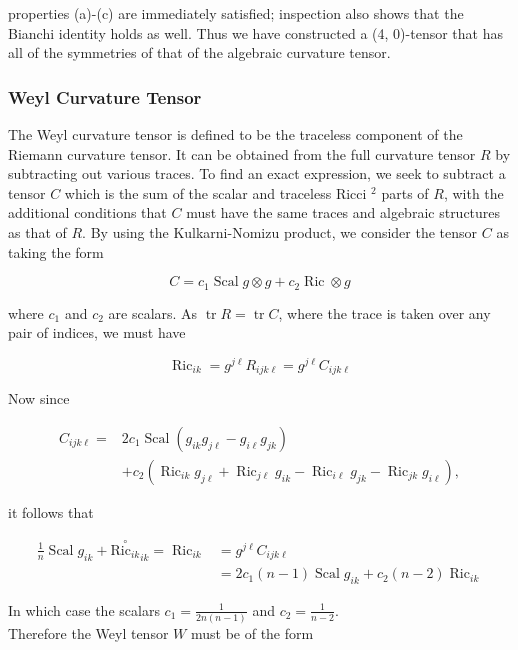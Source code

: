 \documentclass[10pt, letterpaper]{article}
\begin{document}
properties (a)-(c) are immediately satisfied; inspection also shows that the Bianchi identity holds as well. Thus we have constructed a (4, 0)-tensor that has all of the symmetries of that of the algebraic curvature tensor.

\subsubsection*{Weyl Curvature Tensor}
The Weyl curvature tensor is defined to be the traceless component of the Riemann curvature tensor. It can be obtained from the full curvature tensor $R$ by subtracting out various traces. To find an exact expression, we seek to subtract a tensor $C$ which is the sum of the scalar and traceless Ricci ${ }^{2}$ parts of $R$, with the additional conditions that $C$ must have the same traces and algebraic structures as that of $R$. By using the Kulkarni-Nomizu product, we consider the tensor $C$ as taking the form

$$
C=c_{1} \operatorname{Scal} g \otimes g+c_{2} \operatorname{Ric} \otimes g
$$

where $c_{1}$ and $c_{2}$ are scalars. As $\operatorname{tr} R=\operatorname{tr} C$, where the trace is taken over any pair of indices, we must have

$$
\operatorname{Ric}_{i k}=g^{j \ell} R_{i j k \ell}=g^{j \ell} C_{i j k \ell}
$$

Now since

$$
\begin{aligned}
C_{i j k \ell}= & 2 c_{1} \operatorname{Scal}\left(g_{i k} g_{j \ell}-g_{i \ell} g_{j k}\right) \\
& +c_{2}\left(\operatorname{Ric}_{i k} g_{j \ell}+\operatorname{Ric}_{j \ell} g_{i k}-\operatorname{Ric}_{i \ell} g_{j k}-\operatorname{Ric}_{j k} g_{i \ell}\right),
\end{aligned}
$$

it follows that

$$
\begin{aligned}
\frac{1}{n} \operatorname{Scal} g_{i k}+{\stackrel{\circ}{\mathrm{Ric}_{i k}}}_{i k}=\operatorname{Ric}_{i k} & =g^{j \ell} C_{i j k \ell} \\
& =2 c_{1}(n-1) \operatorname{Scal} g_{i k}+c_{2}(n-2) \operatorname{Ric}_{i k}
\end{aligned}
$$

In which case the scalars $c_{1}=\frac{1}{2 n(n-1)}$ and $c_{2}=\frac{1}{n-2}$.\\
Therefore the Weyl tensor $W$ must be of the form
\end{document}
